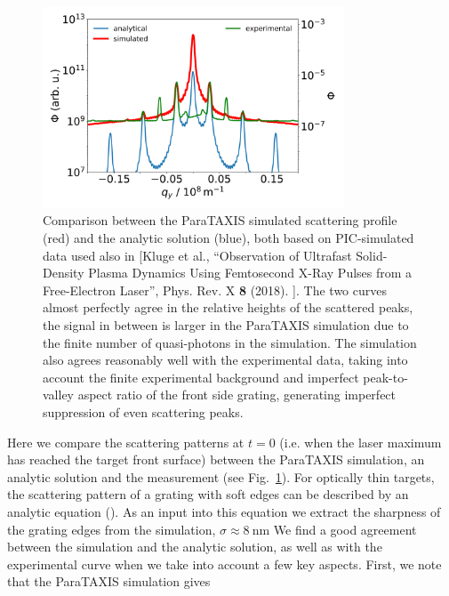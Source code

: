 \documentclass[10pt]{scrartcl}
\begin{document}
\begin{figure}
  \begin{center}
    \includegraphics[width=0.8\textwidth]{figures/parataxis_vs_ln04.png}
    \caption{Comparison between the ParaTAXIS simulated scattering profile
      (red)
      and the analytic solution (blue), both based on PIC-simulated data
      used
      also in [Kluge et al., ``Observation of Ultrafast Solid-Density Plasma
        Dynamics Using Femtosecond X-Ray Pulses from a Free-Electron Laser'', Phys. Rev. X \textbf{8} (2018).
      ].
      The two curves almost perfectly agree in the relative
      heights of the scattered peaks, the signal in between is
      larger in the ParaTAXIS simulation due to the finite number of
      quasi-photons in the simulation.
      The simulation also agrees reasonably well with the
      experimental data, taking into account the finite experimental
      background  and imperfect peak-to-valley aspect ratio of the front
      side grating, generating imperfect suppression of even scattering
      peaks.
    }\label{fig:parataxis_vs_ln04}
  \end{center}
\end{figure}
%
Here we compare the scattering patterns at $t=0$ (i.e. when the laser maximum
has reached the target front surface) between the ParaTAXIS simulation, an
analytic solution and the measurement (see Fig.~\ref{fig:parataxis_vs_ln04}).
For optically
thin targets, the scattering pattern of a grating with soft edges can be
described by an analytic equation (\cite{Kluge2018a}). As an input into this equation
we extract the sharpness of the grating edges from the simulation,
$\sigma\approx \SI{8}{\nano\meter}$ We find a good agreement between the simulation and the
analytic solution, as well as with the experimental curve when we take into
account a few key aspects.  First, we note that the ParaTAXIS simulation gives
\end{document}
